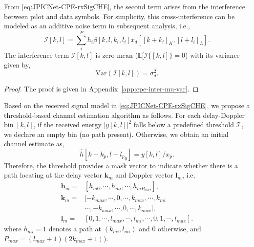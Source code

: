 \documentclass[journal]{IEEEtran}
\begin{document}
From \eqref{eq:JPICNet-CPE-rxSigCHE}, the second term arises from the interference between pilot and data symbols. For simplicity, this cross-interference can be modeled as an additive noise term in subsequent analysis, i.e.,
\begin{equation}
\mathcal{I}[k, l] = \sum_i^P h_i \beta[k, l, k_i, l_i] x_d[[k+k_i]_K, [l+l_i]_L].
\end{equation}
The interference term $\mathcal{I}[k, l]$ is zero-mean ($\mathbb{E}[\mathcal{I}\{[k, l]\}=0$) with its variance given by,
\begin{equation}
\text{Var}(\mathcal{I}[k, l]) = \sigma_d^2.
\end{equation}
\begin{proof}
The proof is given in Appendix~\ref{app:cpe-inter-mu-var}.
\end{proof}

Based on the received signal model in \eqref{eq:JPICNet-CPE-rxSigCHE}, we propose a threshold-based channel estimation algorithm as follows. For each delay-Doppler bin $[k,l]$, if the received energy $|y[k, l]|^2$ falls below a predefined threshold $\mathcal{T}$, we declare an empty bin (no path present). Otherwise, we obtain an initial channel estimate as,
\begin{equation}
\hat{h}[k - k_p, l-{l_p}_0]= y[k,l]/x_p.
\end{equation}
Therefore, the threshold provides a mask vector to indicate whether there is a path locating at the delay vector $\bm k_m$ and Doppler vector $\bm l_m$, i.e,
\begin{subequations}
\begin{align}
\bm h_m = & [h_{m0}, \cdots, h_{mi}, \cdots, h_{mP_{max}}], \label{eq:CPE-hm} \\
\bm k_m = & [-k_{max}, \cdots, 0, \cdots, k_{max}, \cdots, k_{mi} \\
& \cdots, -k_{max}, \cdots, 0, \cdots, k_{max}],
\label{eq:CPE-km} \\
\bm l_m = & [0, 1, \cdots, l_{max}, \cdots, l_{mi}, \cdots, 0, 1, \cdots, l_{max}]. \label{eq:CPE-lm}
\end{align}
\end{subequations}
where $h_{mi} = 1 $ denotes a path at $( k_{mi}, l_{mi})$ and 0 otherwise, and $P_{max} = (l_{max}+1)(2k_{max}+1))$.


\end{document}
